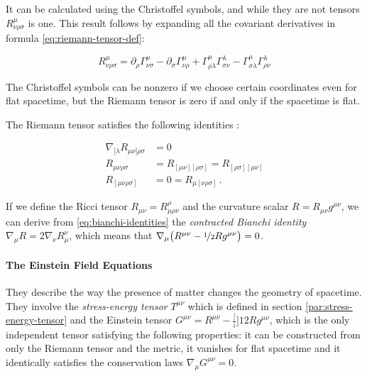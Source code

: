 \documentclass[main.tex]{subfiles}
\begin{document}
It can be calculated using the Christoffel symbols, and while they are not tensors \(R ^{\mu} _{\nu \rho \sigma}\) is one. This result follows by expanding all the covariant derivatives in formula \eqref{eq:riemann-tensor-def}:

\begin{equation}
    R ^{\mu} _{\nu \rho \sigma} =
     \partial_\rho \Gamma^\mu_{\nu \sigma}
    -\partial_\sigma \Gamma^\mu_{\nu \rho}
    +\Gamma^\mu_{\rho \lambda} \Gamma ^{\lambda} _{\sigma \nu}
    -\Gamma^\mu_{\sigma \lambda} \Gamma ^{\lambda} _{\rho \nu}
\end{equation}

The Christoffel symbols can be nonzero if we choose certain coordinates even for flat spacetime, but the Riemann tensor is zero if and only if the spacetime is flat.

The Riemann tensor satisfies the following identities \cite[eqs. 8.45 and 8.76]{MisnerThorneWheeler:1973}:

\vspace{-.5cm}

\begin{subequations}
\begin{align}
  \nabla _{[\lambda} R_{\mu\nu]\rho \sigma} &= 0 \label{eq:bianchi-identities}  \\
  R_{\mu\nu\rho\sigma} &= R_{[\mu\nu][\rho\sigma]} = R_{[\rho\sigma][\mu\nu]}  \\
  R_{[\mu\nu\rho\sigma]} &= 0 = R_{\mu[\nu\rho\sigma]} \,.
\end{align}
\end{subequations}

If we define the Ricci tensor \(R_{\mu\nu} = R^\rho_{\mu \rho \nu}\) and the curvature scalar \(R = R_{\mu\nu}g^{\mu\nu}\), we can derive from \eqref{eq:bianchi-identities} the \emph{contracted Bianchi identity}  \(\nabla_\mu R = 2 \nabla_\nu R^{\nu}_{\mu}\), which means that \(\nabla_\mu \qty(R^{\mu\nu} - \frac[i]{1}{2} R g^{\mu\nu}) = 0\).

\paragraph{The Einstein Field Equations}

They describe the way the presence of matter changes the geometry of spacetime.
They involve the \emph{stress-energy tensor} \(T^{\mu\nu}\) which is defined in section \ref{par:stress-energy-tensor} and the Einstein tensor \(G^{\mu\nu} = R^{\mu\nu} - \frac[i]{1}{2} R g^{\mu\nu}\), which is the only independent tensor satisfying the following properties: it can be constructed from only the Riemann tensor and the metric, it vanishes for flat spacetime and it identically satisfies the conservation laws \(\nabla_\mu G^{\mu\nu} = 0\).
\end{document}
